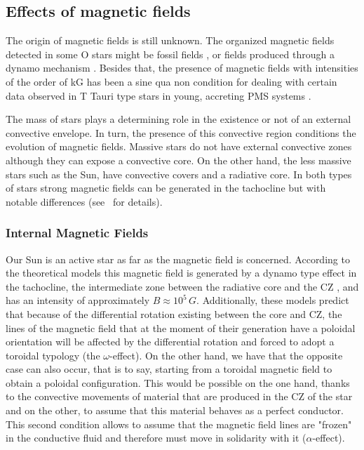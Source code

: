 \documentclass[fleqn,usenatbib]{mnras}
\begin{document}
\subsection{Effects of magnetic fields}
The origin of magnetic fields is still unknown. The organized magnetic fields detected in some O stars \citep{Wade2010} might be fossil fields \citep[see][for details about the theory of fossil magnetic field]{Dudorov2014}, or fields produced through a dynamo mechanism \citep{Cantiello2009}. Besides that, the presence of magnetic fields with intensities of the order of kG \citep{Hussain2014} has been a sine qua non condition for dealing with certain data observed in T Tauri type stars in young, accreting PMS systems \citep{Johns-Krull2007}.\par

The mass of stars plays a determining role in the existence or not of an external convective envelope. In turn, the presence of this convective region conditions the evolution of magnetic fields. Massive stars do not have external convective zones although they can expose a convective core. On the other hand, the less massive stars such as the Sun, have convective covers and a radiative core. In both types of stars strong magnetic fields can be generated in the tachocline but with notable differences (see \citep{Chabrier2006} \citet{Charbonneau2010}\ for details).\par

\subsubsection{Internal Magnetic Fields}
Our Sun is an active star as far as the magnetic field is concerned. According to the theoretical models this magnetic field is generated by a dynamo type effect in the tachocline, the intermediate zone between the radiative core and the CZ \citep{Aschwanden2014}, and has an intensity of approximately $B\approx10^5\, G$. Additionally, these models predict that because of the differential rotation existing between the core and CZ, the lines of the magnetic field that at the moment of their generation have a poloidal orientation will be affected by the differential rotation and forced to adopt a toroidal typology (the $\omega$-effect). On the other hand, we have that the opposite case can also occur, that is to say, starting from a toroidal magnetic field to obtain a poloidal configuration. This would be possible on the one hand, thanks to the convective movements of material that are produced in the CZ of the star and on the other, to assume that this material behaves as a perfect conductor. This second condition allows to assume that the magnetic field lines are "frozen" in the conductive fluid and therefore must move in solidarity with it ($\alpha$-effect).\par
\end{document}
